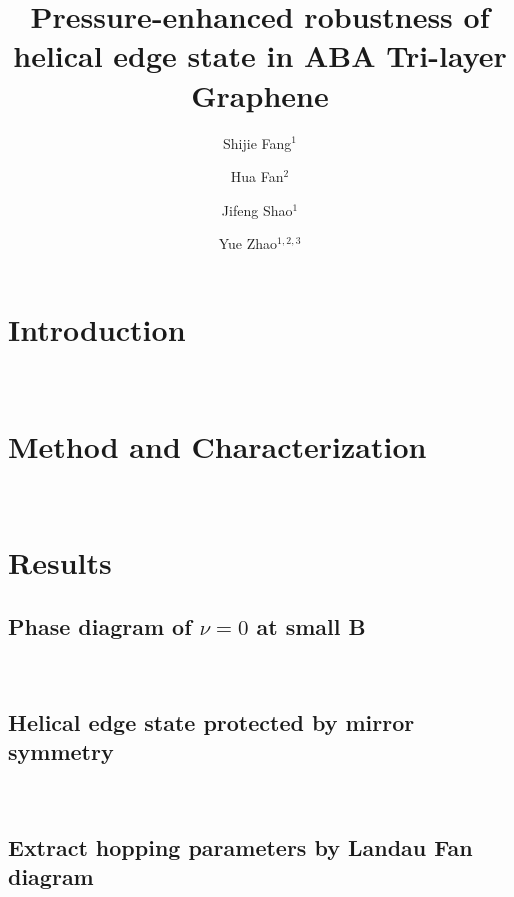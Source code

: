 \documentclass[%
reprint,
amsmath,amssymb,
aps,
]{revtex4-2}
\begin{document}
\title{Pressure-enhanced robustness of helical edge state in ABA Tri-layer Graphene}%
\author{Shijie Fang$^1$}
\author{Hua Fan$^2$}
\author{Jifeng Shao$^1$}
\author{Yue Zhao$^{1,2,3}$}


\maketitle
\section*{Introduction}

~\\

\section*{Method and Characterization}

~\\
\section*{Results}
\subsection*{{\color{red} Phase diagram of $\nu=0$ at small B}}

~\\
\subsection*{{\color{red} Helical edge state protected by mirror symmetry}}

~\\
\subsection*{{\color{red} Extract hopping parameters by Landau Fan diagram}}

~\\
\end{document}
